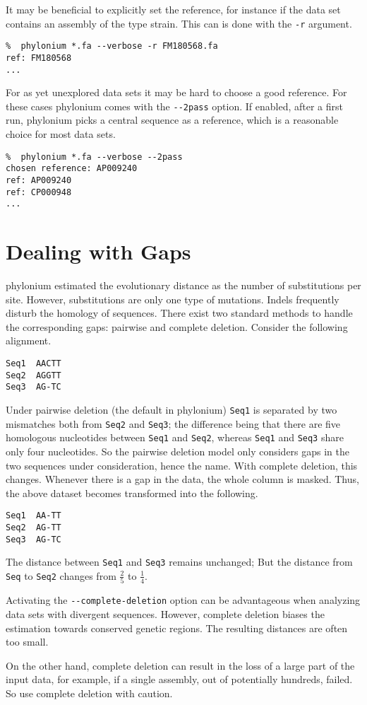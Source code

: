 \documentclass[a4paper,10pt,english]{scrartcl}
\newcommand{\phylonium}{\textsf{phylonium}\xspace}
\begin{document}
It may be beneficial to explicitly set the reference, for instance if the data set contains an assembly of the type strain. This can is done with the \lstinline!-r! argument.

\begin{lstlisting}
%  phylonium *.fa --verbose -r FM180568.fa
ref: FM180568
...
\end{lstlisting}

For as yet unexplored data sets it may be hard to choose a good reference. For these cases \phylonium comes with the \lstinline!--2pass! option. If enabled, after a first run, \phylonium picks a central sequence as a reference, which is a reasonable choice for most data sets.

\begin{lstlisting}
%  phylonium *.fa --verbose --2pass
chosen reference: AP009240
ref: AP009240
ref: CP000948
...
\end{lstlisting}


\section{Dealing with Gaps}

\phylonium estimated the evolutionary distance as the number of substitutions per site.  However, substitutions are only one type of mutations. Indels frequently disturb the homology of sequences. There exist two standard methods to handle the corresponding gaps: pairwise and complete deletion. Consider the following alignment.

\begin{lstlisting}[columns=fixed]
Seq1  AACTT
Seq2  AGGTT
Seq3  AG-TC
\end{lstlisting}

Under pairwise deletion (the default in \phylonium) \lstinline!Seq1! is separated by two mismatches both from \lstinline!Seq2! and \lstinline!Seq3!; the difference being that there are five homologous nucleotides between \lstinline!Seq1! and \lstinline!Seq2!, whereas \lstinline!Seq1! and \lstinline!Seq3! share only four nucleotides. So the pairwise deletion model only considers gaps in the two sequences under consideration, hence the name. With complete deletion, this changes. Whenever there is a gap in the data, the whole column is masked. Thus, the above dataset becomes transformed into the following.

\begin{lstlisting}[columns=fixed]
Seq1  AA-TT
Seq2  AG-TT
Seq3  AG-TC
\end{lstlisting}

The distance between \lstinline!Seq1! and \lstinline!Seq3! remains unchanged; But the distance from \lstinline!Seq! to \lstinline!Seq2! changes from $\frac{2}{5}$ to $\frac{1}{4}$.

Activating the \lstinline!--complete-deletion! option can be advantageous when analyzing data sets with divergent sequences. However, complete deletion biases the estimation towards conserved genetic regions. The resulting distances are often too small. 

On the other hand, complete deletion can result in the loss of a large part of the input data, for example, if a single assembly, out of potentially hundreds, failed. So use complete deletion with caution.
\end{document}
